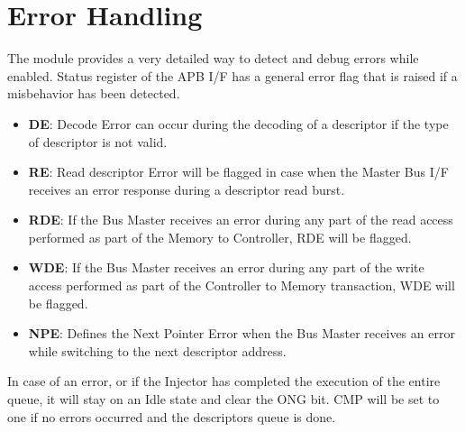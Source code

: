\section{Error Handling}
The module provides a very detailed way to detect and debug errors while enabled. Status register of the APB I/F has a general error flag that is raised if a misbehavior has been detected.

\begin{itemize}
 	\item \textbf{DE}: Decode Error can occur during the decoding of a descriptor if the type of descriptor is not valid.
  	\item \textbf{RE}: Read descriptor Error will be flagged in case when the Master Bus I/F receives an error response during a descriptor read burst.
	\item \textbf{RDE}: If the Bus Master receives an error during any part of the read access performed as part of the Memory to Controller, RDE will be flagged.
	\item \textbf{WDE}: If the Bus Master receives an error during any part of the write access performed as part of the Controller to Memory transaction, WDE will be flagged.
	\item \textbf{NPE}: Defines the Next Pointer Error when the Bus Master receives an error while switching to the next descriptor address.
\end{itemize}

In case of an error, or if the Injector has completed the execution of the entire queue, it will stay on an Idle state and clear the ONG bit. 
CMP will be set to one if no errors occurred and the descriptors queue is done. 